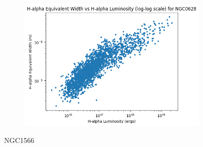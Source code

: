 \documentclass[12pt]{report}
\begin{document}
\begin{figure}[htbp]
\begin{subfigure}{0.3\textwidth}
        \label{fig:image5}
    \end{subfigure}
    \hfill
    \begin{subfigure}{0.3\textwidth}
        \centering
        \includegraphics[width=\linewidth]{image6.png}
        \label{fig:image6}
    \end{subfigure}

    
    \vspace{0.5cm}
    \caption*{NGC1566}
    

\end{figure}
\end{document}
